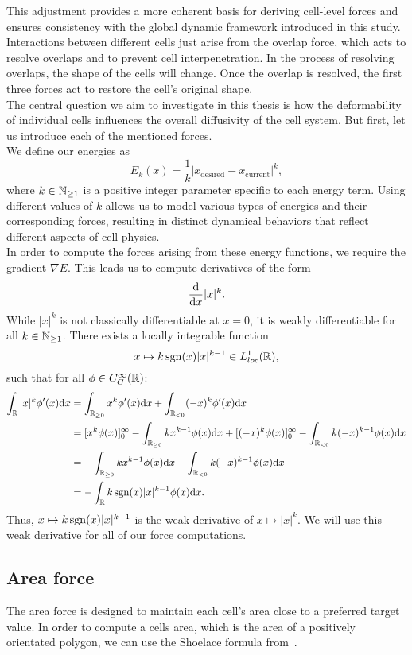 This adjustment provides a more coherent basis for deriving cell-level forces and ensures consistency with the global dynamic framework introduced in this study. \\
Interactions between different cells just arise from the overlap force, which acts to resolve overlaps and to prevent cell interpenetration. 
In the process of resolving overlaps, the shape of the cells will change.  
Once the overlap is resolved, the first three forces act to restore the cell's original shape. \\
The central question we aim to investigate in this thesis is how the deformability of individual cells influences the overall diffusivity of the cell system.
But first, let us introduce each of the mentioned forces. \\
We define our energies as
\[E_k(x) = \frac{1}{k} |x_{\text{desired}} - x_{\text{current}}|^k, \]
where $k \in \mathbb{N}_{\geq 1}$ is a positive integer parameter specific to each energy term. 
Using different values of $k$ allows us to model various types of energies and their corresponding forces, resulting in distinct dynamical behaviors that reflect different aspects of cell physics. \\
In order to compute the forces arising from these energy functions, we require the gradient $\nabla E$. 
This leads us to compute derivatives of the form 
\[ \frac{\mathrm{d}}{\mathrm{d} x} |x|^k. \]
While $|x|^k$ is not classically differentiable at $x=0$, it is weakly differentiable for all $k \in \mathbb{N}_{\geq 1}$.
There exists a locally integrable function 
\[ x \mapsto k \operatorname{sgn}(x)|x|^{k-1} \in L^1_{loc}(\mathbb{R}),\] 
such that for all $\phi \in C_C^{\infty}(\mathbb{R})$:
\begin{align*}
	\int_{\mathbb{R}} |x|^k \phi'(x) \mathrm{d} x  
	&= \int_{\mathbb{R}_{\geq 0}} x^k \phi'(x) \mathrm{d} x + \int_{\mathbb{R}_{< 0}} (-x)^k \phi'(x) \mathrm{d} x \\
	&= [x^k \phi(x)]_{0}^{\infty} - \int_{\mathbb{R}_{\geq 0}} k x^{k-1} \phi(x) \mathrm{d} x + [(-x)^k \phi(x)]_{0}^{\infty} - \int_{\mathbb{R}_{< 0}} k (-x)^{k-1} \phi(x) \mathrm{d} x \\
	&= - \int_{\mathbb{R}_{\geq 0}} k x^{k-1} \phi(x) \mathrm{d} x - \int_{\mathbb{R}_{< 0}} k (-x)^{k-1} \phi(x) \mathrm{d} x \\
	&= - \int_{\mathbb{R}} k \operatorname{sgn}(x)|x|^{k-1} \phi(x) \mathrm{d} x.
\end{align*}
Thus, $x \mapsto k \operatorname{sgn}(x)|x|^{k-1}$ is the weak derivative of $x \mapsto |x|^k$. 
We will use this weak derivative for all of our force computations. 

\subsection{Area force}
The area force is designed to maintain each cell's area close to a preferred target value. 
In order to compute a cells area, which is the area of a positively orientated polygon, we can use the Shoelace formula from~\cite{Shoelace2014}. 

